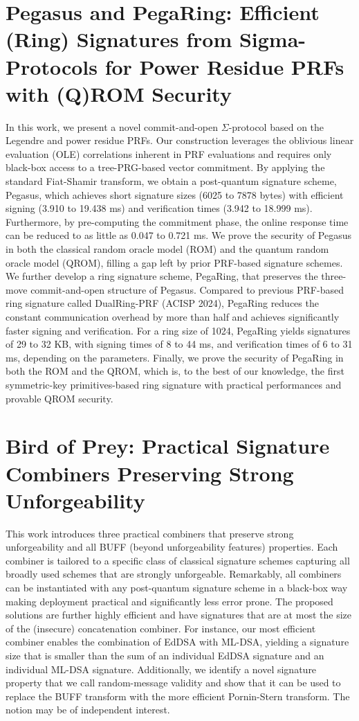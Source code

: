 \documentclass[11pt,oneside]{book}
\theoremstyle{definition}
\theoremstyle{remark}
\theoremstyle{plain}
\begin{document}
 \section{\cite{cryptoeprint:2025/1841} Pegasus and PegaRing: Efficient (Ring) Signatures from Sigma-Protocols for Power Residue PRFs with (Q)ROM Security}
In this work, we present a novel commit-and-open $\Sigma$-protocol based on the Legendre and power residue PRFs. Our construction leverages the oblivious linear evaluation (OLE) correlations inherent in PRF evaluations and requires only black-box access to a tree-PRG-based vector commitment. By applying the standard Fiat-Shamir transform, we obtain a post-quantum signature scheme, Pegasus, which achieves short signature sizes (6025 to 7878 bytes) with efficient signing (3.910 to 19.438 ms) and verification times (3.942 to 18.999 ms). Furthermore, by pre-computing the commitment phase, the online response time can be reduced to as little as 0.047 to 0.721 ms. We prove the security of Pegasus in both the classical random oracle model (ROM) and the quantum random oracle model (QROM), filling a gap left by prior PRF-based signature schemes. We further develop a ring signature scheme, PegaRing, that preserves the three-move commit-and-open structure of Pegasus. Compared to previous PRF-based ring signature called DualRing-PRF (ACISP 2024), PegaRing reduces the constant communication overhead by more than half and achieves significantly faster signing and verification. For a ring size of 1024, PegaRing yields signatures of 29 to 32 KB, with signing times of 8 to 44 ms, and verification times of 6 to 31 ms, depending on the parameters. Finally, we prove the security of PegaRing in both the ROM and the QROM, which is, to the best of our knowledge, the first symmetric-key primitives-based ring signature with practical performances and provable QROM security.

\section{\cite{cryptoeprint:2025/1844} Bird of Prey: Practical Signature Combiners Preserving Strong Unforgeability}
This work introduces three practical combiners that preserve strong unforgeability and all BUFF (beyond unforgeability features) properties. Each combiner is tailored to a specific class of classical signature schemes capturing all broadly used schemes that are strongly unforgeable. Remarkably, all combiners can be instantiated with any post-quantum signature scheme in a black-box way making deployment practical and significantly less error prone. The proposed solutions are further highly efficient and have signatures that are at most the size of the (insecure) concatenation combiner. For instance, our most efficient combiner enables the combination of EdDSA with ML-DSA, yielding a signature size that is smaller than the sum of an individual EdDSA signature and an individual ML-DSA signature. Additionally, we identify a novel signature property that we call random-message validity and show that it can be used to replace the BUFF transform with the more efficient Pornin-Stern transform. The notion may be of independent interest.
\end{document}
